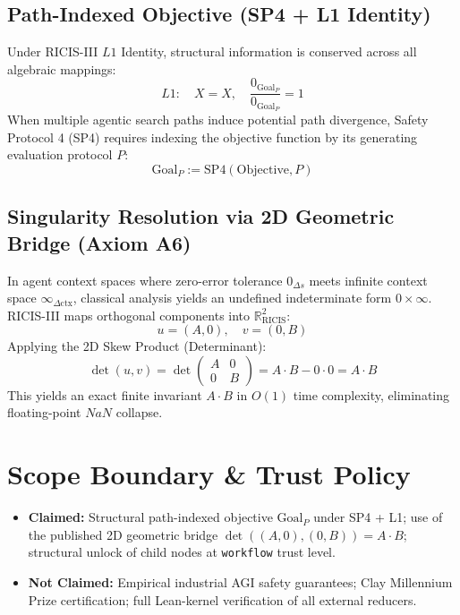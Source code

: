 \documentclass[11pt,a4paper]{article}
\begin{document}
\subsection{Path-Indexed Objective (SP4 + L1 Identity)}
Under RICIS-III $L1$ Identity, structural information is conserved across all algebraic mappings:
\begin{equation}
L1: \quad X = X, \quad \frac{0_{\mathrm{Goal}_P}}{0_{\mathrm{Goal}_P}} = 1
\end{equation}
When multiple agentic search paths induce potential path divergence, Safety Protocol 4 (SP4) requires indexing the objective function by its generating evaluation protocol $P$:
\begin{equation}
\mathrm{Goal}_P := \mathrm{SP4}(\mathrm{Objective}, P)
\end{equation}

\subsection{Singularity Resolution via 2D Geometric Bridge (Axiom A6)}
In agent context spaces where zero-error tolerance $0_{\Delta s}$ meets infinite context space $\infty_{\Delta\mathrm{ctx}}$, classical analysis yields an undefined indeterminate form $0 \times \infty$. RICIS-III maps orthogonal components into $\mathbb{R}^2_{\mathrm{RICIS}}$:
\begin{equation}
u = (A, 0), \quad v = (0, B)
\end{equation}
Applying the 2D Skew Product (Determinant):
\begin{equation}
\det(u, v) = \det\begin{pmatrix} A & 0 \\ 0 & B \end{pmatrix} = A \cdot B - 0 \cdot 0 = A \cdot B
\end{equation}
This yields an exact finite invariant $A \cdot B$ in $O(1)$ time complexity, eliminating floating-point $NaN$ collapse.

\section{Scope Boundary \& Trust Policy}
\begin{itemize}
    \item \textbf{Claimed:} Structural path-indexed objective $\mathrm{Goal}_P$ under SP4 + L1; use of the published 2D geometric bridge $\det((A,0),(0,B)) = A \cdot B$; structural unlock of child nodes at \texttt{workflow} trust level.
    \item \textbf{Not Claimed:} Empirical industrial AGI safety guarantees; Clay Millennium Prize certification; full Lean-kernel verification of all external reducers.
\end{itemize}
\end{document}

